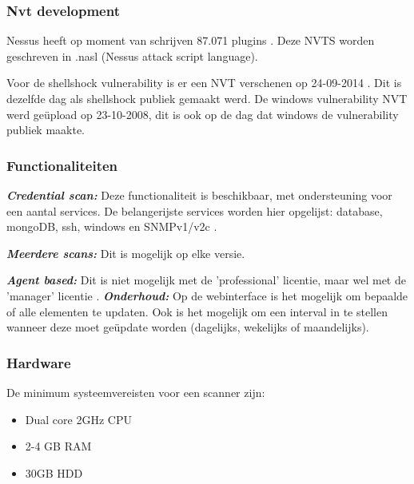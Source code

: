 \subsubsection{Nvt development}
Nessus heeft op moment van schrijven 87.071 plugins \textcite{Nessus-nvt}. Deze NVTS worden geschreven in .nasl (Nessus attack script language).

Voor de shellshock vulnerability is er een NVT verschenen op 24-09-2014 \textcite{Vulners-shellshock-nessus}. Dit is dezelfde dag als shellshock publiek gemaakt werd. De windows vulnerability NVT werd geüpload op 23-10-2008, dit is ook op de dag dat windows de vulnerability publiek maakte.
 

\subsubsection{Functionaliteiten}
\textbf{\textit{Credential scan: }} Deze functionaliteit is beschikbaar, met ondersteuning voor een aantal services. De belangerijste services worden hier opgelijst: database, mongoDB, ssh, windows en SNMPv1/v2c \textcite{Nessus-functions}.

\textbf{\textit{Meerdere scans: }} Dit is mogelijk op elke versie.

\textbf{\textit{Agent based: }} Dit is niet mogelijk met de 'professional' licentie, maar wel met de 'manager' licentie \textcite{Nessus-functions}.
\textbf{\textit{Onderhoud: }} Op de webinterface is het mogelijk om bepaalde of alle  elementen te updaten. Ook is het mogelijk om een interval in te stellen wanneer deze moet geüpdate worden (dagelijks, wekelijks of maandelijks).

\subsubsection{Hardware}
De minimum systeemvereisten voor een scanner zijn:
\begin{itemize}
\item Dual core 2GHz CPU
\item 2-4 GB RAM
\item 30GB HDD
\end{itemize}

\textcite{Nessus-requirements}


